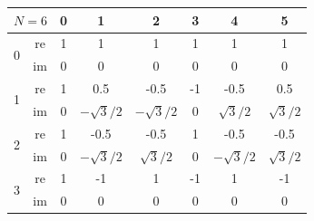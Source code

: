 \begin{center}
	\begin{tabular}{| c c c c c c c c |}
		\hline
		\multicolumn{2}{|c}{$N=6$} & \multicolumn{1}{c}{ \tiny 0} & \multicolumn{1}{c}{ \tiny 1} & \multicolumn{1}{c}{ \tiny 2} & \multicolumn{1}{c}{ \tiny 3} & \multicolumn{1}{c}{ \tiny 4} & \multicolumn{1}{c|}{ \tiny 5}                 \\
		\hline
		\hline
		\multirow{2}{*}{0}         & re                           & 1                            & 1                            & 1                            & 1                            & 1                             & 1             \\
		                           & im                           & 0                            & 0                            & 0                            & 0                            & 0                             & 0             \\
		\hline\hline
		\multirow{2}{*}{1}         & re                           & 1                            & 0.5                          & -0.5                         & -1                           & -0.5                          & 0.5           \\
		                           & im                           & 0                            & $-\sqrt{3}/2$                & $-\sqrt{3}/2$                & 0                            & $\sqrt{3}/2$                  & $\sqrt{3}/2$  \\
		\hline\hline
		\multirow{2}{*}{2}         & re                           & 1                            & -0.5                         & -0.5                         & 1                            & -0.5                          & -0.5          \\
		                           & im                           & 0                            & $-\sqrt{3}/2$                & $\sqrt{3}/2$                 & 0                            & $-\sqrt{3}/2$                 & $\sqrt{3}/2$  \\
		\hline\hline
		\multirow{2}{*}{3}         & re                           & 1                            & -1                           & 1                            & -1                           & 1                             & -1            \\
		                           & im                           & 0                            & 0                            & 0                            & 0                            & 0                             & 0             \\

\end{tabular}
\end{center}
